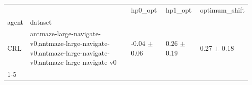\begin{tabular}{lllll}
\toprule
 &  & hp0_opt & hp1_opt & optimum_shift \\
agent & dataset &  &  &  \\
\midrule
CRL & antmaze-large-navigate-v0,antmaze-large-navigate-v0,antmaze-large-navigate-v0,antmaze-large-navigate-v0 & -0.04 $\pm$ 0.06 & 0.26 $\pm$ 0.19 & 0.27 $\pm$ 0.18 \\
\cline{1-5}
\bottomrule
\end{tabular}
